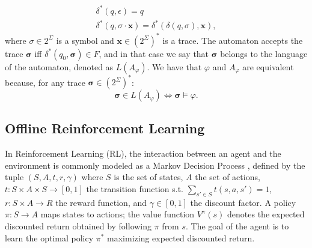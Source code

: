\begin{equation}
\begin{array}{l}
    \delta^*(q,\epsilon) = q \\
    \delta^*(q, \sigma \cdot \boldsymbol{x}) = \delta^*(\delta(q,\sigma) , \boldsymbol{x}),
\end{array}
\end{equation}
where $\sigma \in 2^\Sigma$ is a symbol and $\boldsymbol{x} \in (2^\Sigma)^*$ is a trace.  
The automaton accepts the trace $\boldsymbol{\sigma}$ iff $\delta^*(q_0, \boldsymbol{\sigma}) \in F$, and in that case we say that $\boldsymbol{\sigma}$ belongs to the language of the automaton, denoted as $L(A_\varphi)$.  
We have that $\varphi$ and $A_\varphi$ are equivalent because, for any trace $\boldsymbol{\sigma} \in (2^\Sigma)^*$:
\begin{equation}
\boldsymbol{\sigma}\in L(A_\varphi) \iff\boldsymbol{\sigma}\vDash\varphi.
\end{equation}

\subsection{Offline Reinforcement Learning}

In Reinforcement Learning (RL), the interaction between an agent and the environment is commonly modeled as a Markov Decision Process \cite{sutton1998reinforcement}, defined by the tuple $(S,A,t,r,\gamma)$ where $S$ is the set of states, $A$ the set of actions, $t : S \times A \times S \rightarrow [0,1]$ the transition function s.t. $\sum_{s' \in S} t(s,a,s') = 1$, $r : S \times A \rightarrow R$ the reward function, and $\gamma \in [0,1]$ the discount factor. A policy $\pi : S \rightarrow A$ maps states to actions; the value function $V^\pi(s)$ denotes the expected discounted return obtained by following $\pi$ from $s$. The goal of the agent is to learn the optimal policy $\pi^*$ maximizing expected discounted return. 

